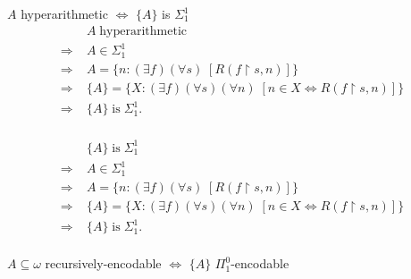 \begin{frame}{$A$ hyperarithmetic $\Leftrightarrow$ $\{A\}$ is $\Sigma_1^1$}
  \begin{align*}
    \;&A\; \text{hyperarithmetic}\\
    \Rightarrow\; & A\in\Sigma_1^1\\
    \Rightarrow\; & A=\{n:(\exists f)(\forall s)\; [R(f\restriction s,n)]\}\\
    \Rightarrow\; & \{A\}= \{X:(\exists f)(\forall s)(\forall n)\;
      [n\in X \Leftrightarrow R(f\restriction s,n)]\}\\
    \Rightarrow\; &\{A\}\; \text{is}\; \Sigma_1^1.\\
  \end{align*}

  \begin{align*}
    \;&\{A\}\; \text{is}\; \Sigma_1^1\\
    \Rightarrow\; & A\in\Sigma_1^1\\
    \Rightarrow\; & A=\{n:(\exists f)(\forall s)\; [R(f\restriction s,n)]\}\\
    \Rightarrow\; & \{A\}= \{X:(\exists f)(\forall s)(\forall n)\;
      [n\in X \Leftrightarrow R(f\restriction s,n)]\}\\
    \Rightarrow\; &\{A\}\; \text{is}\; \Sigma_1^1.\\
  \end{align*}
\end{frame}

\begin{frame}{$A\subseteq\omega$ recursively-encodable $\Leftrightarrow$
$\{A\}$ $\Pi_1^0$-encodable}
\end{frame}

